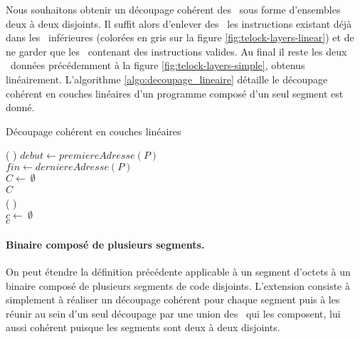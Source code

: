 Nous souhaitons obtenir un découpage cohérent des \layers\ sous forme d'ensembles deux à deux disjoints.
Il suffit alors d'enlever des \layers\ les instructions existant déjà dans les \layers\ inférieures (colorées en gris sur la figure \ref{fig:telock-layers-linear}) et de ne garder que les \layers\ contenant des instructions valides.
Au final il reste les deux \layers\ données précédemment à la figure \ref{fig:telock-layers-simple}, obtenus linéairement.
L'algorithme \ref{algo:decoupage_lineaire} détaille le découpage cohérent en couches linéaires d'un programme composé d'un seul segment est donné.

\begin{algorithm}[h]
\caption{Découpage cohérent en couches linéaires}
\SetAlgoLined
{}
\Fn(
){}{
$debut \leftarrow premiereAdresse(P)$    \\
$fin \leftarrow derniereAdresse(P)$    \\
$C \leftarrow\ \emptyset$\\
\Return $C$
}
~\\
\Fn(
){}{
  \\
  $c \leftarrow\ \emptyset$\\
  \Return $c$
}
\label{algo:decoupage_lineaire}
\end{algorithm}

\paragraph{Binaire composé de plusieurs segments.}
On peut étendre la définition précédente applicable à un segment d'octets à un binaire composé de plusieurs segments de code disjoints.
L'extension consiste à simplement à réaliser un découpage cohérent pour chaque segment puis à les réunir au sein d'un seul découpage par une union des \layers\ qui les composent, lui aussi cohérent puisque les segments sont deux à deux disjoints.

